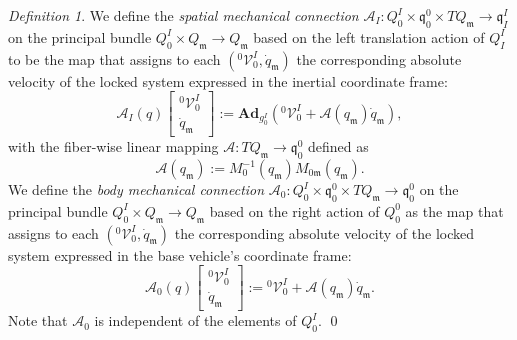 \documentclass[lettersize,journal]{IEEEtran}
\def \q  {\mathfrak{q}}
\def \m  {\mathfrak{m}}
\def \V {\mathcal{V}}
\def \Ad {\textbf{Ad}}
\def \A {\mathcal{A}}
\theoremstyle{remark}
\newtheorem{definition}{Definition}
\begin{document}
\begin{definition}
We define the \textit{spatial mechanical connection}  $\mathcal{A}_I\colon Q_0^I\times \q^0_0 \times TQ_\m \rightarrow \q^I_I$ on the principal bundle $Q^I_0 \times Q_\m \rightarrow Q_\m$ based on the left translation action of $Q^I_I$ to be the map that assigns to each $({}^0\V^I_0,\dot{q}_\m)$ the corresponding absolute velocity of the locked system expressed in the inertial coordinate frame:
\begin{equation}
    \A_I(q)\begin{bmatrix}
{}^0\mathcal{V}_0^I\\ \dot{q}_\mathfrak{m}
\end{bmatrix}:=\Ad_{g^I_0}({}^0\V^I_0+\A(q_\m)\dot{q}_\m),
\end{equation}
with the fiber-wise linear mapping $\A\colon TQ_\m \rightarrow \q^0_0$ defined as 
\begin{equation}
  \A(q_\m):= M_0^{-1}(q_\m)M_{0\m}(q_\m).
  \label{specialjabocian}
\end{equation}
We define the \textit{body mechanical connection} $\A_0:Q_0^I\times\q^0_0\times TQ_\m \rightarrow \q^0_0$ on the principal bundle $Q^I_0 \times Q_\m \rightarrow Q_\m$ based on the right action of $Q^0_0$ as the map that assigns to each $({}^0\V^I_0,\dot{q}_\m)$ the corresponding absolute velocity of the locked system expressed in the base vehicle's coordinate frame:
\begin{equation}
   \A_0(q)\begin{bmatrix}
{}^0\mathcal{V}_0^I\\ \dot{q}_\mathfrak{m}
\end{bmatrix}:={}^0\V^I_0+\A(q_\m)\dot{q}_\m.
\end{equation}
Note that $\A_0$ is independent of the elements of $Q_0^I$.
\qed
\end{definition} 
\end{document}
